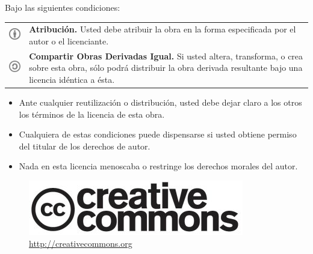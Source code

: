 \noindent Bajo las siguientes condiciones:\newline
\begin{tabular}[t]{rl}
\multirow{5}{*}{\includegraphics{licencia/by.jpg}} &
\multirow{5}{*}{\parbox{300pt}{\textbf{Atribución.} Usted debe atribuir la
obra en la forma especificada por el autor o el licenciante.}} \\ \\ \\ \\ \\
\multirow{5}{*}{\includegraphics{licencia/sa.jpg}} &
\multirow{5}{*}{\parbox{300pt}{\textbf{Compartir Obras Derivadas Igual.} Si
usted altera, transforma, o crea sobre esta obra, sólo podrá distribuir la
obra derivada resultante bajo una licencia idéntica a ésta.}} \\ \\ \\ \\
\end{tabular}\newline\newline

\begin{itemize}
\item Ante cualquier reutilización o distribución, usted debe dejar claro a
los otros los términos de la licencia de esta obra.
\item Cualquiera de estas condiciones puede dispensarse si usted obtiene
permiso del titular de los derechos de autor.
\item Nada en esta licencia menoscaba o restringe los derechos morales del
autor.
\end{itemize}

\begin{figure}[b]
\begin{center}
\includegraphics*[scale=0.5]{licencia/cc-logo.jpg}
\linebreak\href{http://creativecommons.org}{http://creativecommons.org}
\end{center}
\end{figure}

\normalsize

